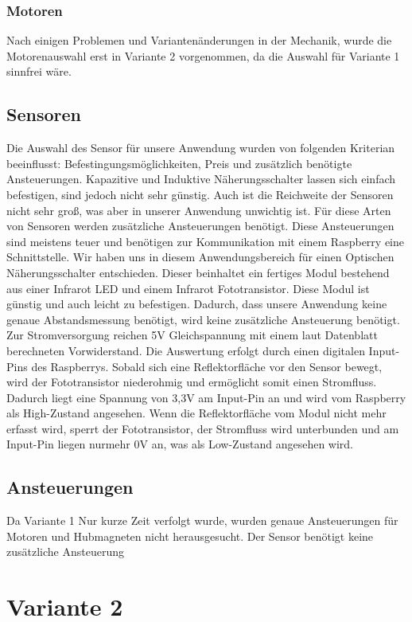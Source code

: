 \subsubsection{Motoren}
Nach einigen Problemen und Variantenänderungen in der Mechanik, wurde die Motorenauswahl erst in Variante 2 vorgenommen, da die Auswahl für Variante 1 sinnfrei wäre.

\subsection{Sensoren}
Die Auswahl des Sensor für unsere Anwendung wurden von folgenden Kriterian beeinflusst: Befestingungsmöglichkeiten, Preis und zusätzlich benötigte Ansteuerungen.
Kapazitive und Induktive Näherungsschalter lassen sich einfach befestigen, sind jedoch nicht sehr günstig. Auch ist die Reichweite der Sensoren nicht sehr groß, was aber in unserer Anwendung unwichtig ist. Für diese Arten von Sensoren werden zusätzliche Ansteuerungen benötigt. Diese Ansteuerungen sind meistens teuer und benötigen zur Kommunikation mit einem Raspberry eine Schnittstelle.
Wir haben uns in diesem Anwendungsbereich für einen Optischen Näherungsschalter entschieden. Dieser beinhaltet ein fertiges Modul bestehend aus einer Infrarot LED und einem Infrarot Fototransistor. Diese Modul ist günstig und auch leicht zu befestigen. Dadurch, dass unsere Anwendung keine genaue Abstandsmessung benötigt, wird keine zusätzliche Ansteuerung benötigt. Zur Stromversorgung reichen 5V Gleichspannung mit einem laut Datenblatt berechneten Vorwiderstand. Die Auswertung erfolgt durch einen digitalen Input-Pins des Raspberrys. Sobald sich eine Reflektorfläche vor den Sensor bewegt, wird der Fototransistor niederohmig und ermöglicht somit einen Stromfluss. Dadurch liegt eine Spannung von 3,3V am Input-Pin an und wird vom Raspberry als High-Zustand angesehen. Wenn die Reflektorfläche vom Modul nicht mehr erfasst wird, sperrt der Fototransistor, der Stromfluss wird unterbunden und am Input-Pin liegen nurmehr 0V an, was als Low-Zustand angesehen wird.

\subsection{Ansteuerungen}
Da Variante 1 Nur kurze Zeit verfolgt wurde, wurden genaue Ansteuerungen für Motoren und Hubmagneten nicht herausgesucht. Der Sensor benötigt keine zusätzliche Ansteuerung

\section{Variante 2}
